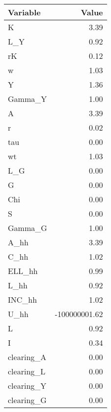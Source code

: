 \begin{tabular}{l r}
\hline
Variable  & Value \\
\hline
K & 3.39 \\
L_Y & 0.92 \\
rK & 0.12 \\
w & 1.03 \\
Y & 1.36 \\
Gamma_Y & 1.00 \\
A & 3.39 \\
r & 0.02 \\
tau & 0.00 \\
wt & 1.03 \\
L_G & 0.00 \\
G & 0.00 \\
Chi & 0.00 \\
S & 0.00 \\
Gamma_G & 1.00 \\
A_hh & 3.39 \\
C_hh & 1.02 \\
ELL_hh & 0.99 \\
L_hh & 0.92 \\
INC_hh & 1.02 \\
U_hh & -100000001.62 \\
L & 0.92 \\
I & 0.34 \\
clearing_A & 0.00 \\
clearing_L & 0.00 \\
clearing_Y & 0.00 \\
clearing_G & 0.00 \\
\hline
\end{tabular}

